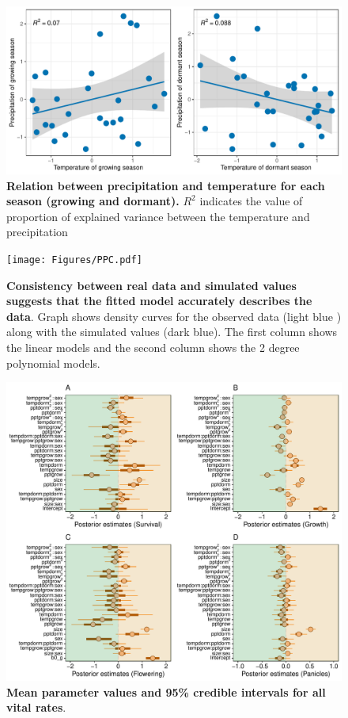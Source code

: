 \documentclass[12pt]{article}
\begin{document}
\begin{figure}[h!]
		\centering
		\includegraphics[width=0.95\linewidth]{Figures/Varianceexplained.pdf}
		\caption{\textbf{Relation between precipitation and temperature for each season (growing and dormant).} $R^2$ indicates the value of proportion of explained variance between the temperature and precipitation}
		\label{Sup:Correlation}
\end{figure}
	
\begin{figure}[h!]
		\centering
		\texttt{[image: Figures/PPC.pdf]}
		\caption{\textbf{Consistency between real data and simulated values suggests that the fitted model accurately describes the data}. Graph shows density curves for the observed data (light blue ) along with the simulated values (dark blue). The first column shows the linear models and the second column shows the 2 degree polynomial models.}
		\label{Sup:PPC}
	\end{figure}
	
\begin{figure}[h!]
		\centering
		\includegraphics[width=0.95\linewidth]{Figures/Posterior_mean.pdf}
		\caption{\textbf{Mean parameter values and 95\% credible intervals for all vital rates}. }
		\label{Sup:Posterior}
\end{figure}
	
\end{document}
